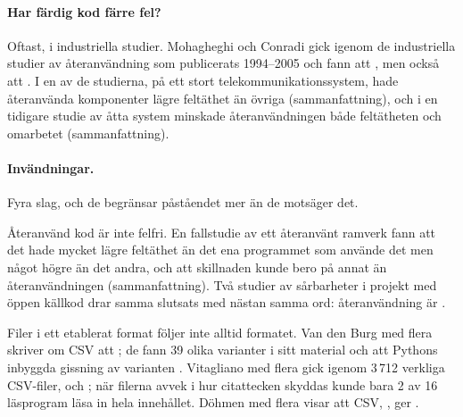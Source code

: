\paragraph{Har färdig kod färre fel?}  Oftast, i industriella studier.
Mohagheghi och Conradi gick igenom de industriella studier av
återanvändning som publicerats 1994--2005 och fann att
, men också att .  I en av de studierna, på ett stort
telekommunikationssystem, hade återanvända komponenter lägre feltäthet
än övriga\autocite{Mohagheghi2004Reuse} (sammanfattning), och i en
tidigare studie av åtta system minskade återanvändningen både
feltätheten och omarbetet\autocite{Basili1996Reuse} (sammanfattning).

\paragraph{Invändningar.}  Fyra slag, och de begränsar påståendet mer än
de motsäger det.

Återanvänd kod är inte felfri.  En fallstudie av ett återanvänt ramverk
fann att det hade mycket lägre feltäthet än det ena programmet som
använde det men något högre än det andra, och att skillnaden kunde bero
på annat än återanvändningen\autocite{Gupta2009Reuse} (sammanfattning).
Två studier av sårbarheter i projekt med öppen källkod drar samma
slutsats med nästan samma ord: återanvändning är
\autocite[se även][]{Gkortzis2021Reuse}.

Filer i ett etablerat format följer inte alltid formatet.  Van den Burg
med flera skriver om CSV att ; de fann 39
olika varianter i sitt material och att Pythons inbyggda gissning av
varianten .  Vitagliano med flera gick igenom 3\,712 verkliga
CSV-filer, och ; när filerna
avvek i hur citattecken skyddas kunde bara 2 av 16 läsprogram läsa in
hela innehållet\autocite[1876]{Vitagliano2023Pollock}.  Döhmen med flera
visar att CSV, , ger
.

